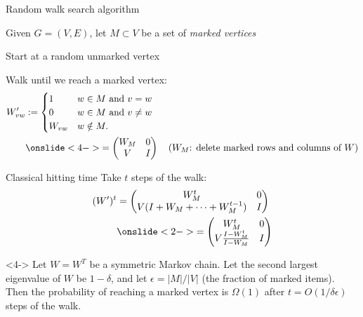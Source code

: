 \begin{frame}{Random walk search algorithm}

Given $G=(V,E)$, let $M \subset V$ be a set of \emph{marked vertices}

\pause
\bigskip

Start at a random unmarked vertex

\bigskip

Walk until we reach a marked vertex\pause{}:
\begin{align*}
  W'_{vw} &:= \begin{cases}
  1 & w\in M \text{~and~} v=w \\
  0 & w\in M \text{~and~} v\ne w \\
  W_{vw} & w \notin M.
  \end{cases} \\
  &\onslide<4->{= \begin{pmatrix}
  W_M & 0 \\ V & I
\end{pmatrix}
\quad \text{($W_M$: delete marked rows and columns of $W$)}}
\end{align*}

\bigskip


\end{frame}


\begin{frame}{Classical hitting time}
Take $t$ steps of the walk:
\begin{align*}
  (W')^t
  &=
  \begin{pmatrix}
  W_M^t & 0 \\ V (I + W_M + \cdots + W_M^{t-1}) & I
  \end{pmatrix} \\
  &\onslide<2->{= \begin{pmatrix}
  W_M^t & 0 \\ V \frac{I - W_M^t}{I - W_M} & I
  \end{pmatrix}}
\end{align*}

\medskip


\medskip

\begin{lemma}<4->
  Let $W = W^T$ be a symmetric Markov chain.
  Let the second largest eigenvalue of $W$ be $1-\delta$, and let $\epsilon = |M|/|V|$ (the fraction of marked items).
  Then the probability of reaching a marked vertex is $\Omega(1)$ after $t = O(1/\delta\epsilon)$ steps of the walk.
\end{lemma}

\end{frame}

